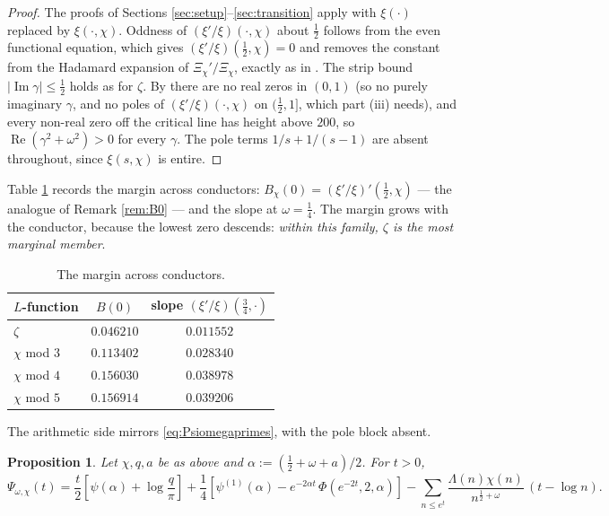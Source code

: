 \documentclass[11pt,reqno]{amsart}
\theoremstyle{plain}
\newtheorem{proposition}[theorem]{Proposition}
\theoremstyle{definition}
\newcommand{\Rp}{\operatorname{Re}}
\newcommand{\Ip}{\operatorname{Im}}
\begin{document}
\begin{proof}
The proofs of Sections \ref{sec:setup}--\ref{sec:transition} apply with $\xi(\cdot)$ replaced by
$\xi(\cdot,\chi)$. Oddness of $(\xi'/\xi)(\cdot,\chi)$ about $\tfrac12$ follows from the even
functional equation, which gives $(\xi'/\xi)(\tfrac12,\chi)=0$ and removes the constant from the
Hadamard expansion of $\Xi_\chi'/\Xi_\chi$, exactly as in \cite[\S2.2]{Suzuki2023}. The strip
bound $|\Ip\gamma|\le\tfrac12$ holds as for $\zeta$. By \cite{Platt2016} there are no real zeros
in $(0,1)$ (so no purely imaginary $\gamma$, and no poles of $(\xi'/\xi)(\cdot,\chi)$ on
$(\tfrac12,1]$, which part (iii) needs), and every non-real zero off the critical line has height
above $200$, so $\Rp(\gamma^{2}+\omega^{2})>0$ for every $\gamma$. The pole terms $1/s+1/(s-1)$
are absent throughout, since $\xi(s,\chi)$ is entire.
\end{proof}

Table \ref{tab:conductor} records the margin across conductors: $B_\chi(0)=(\xi'/\xi)'(\tfrac12,\chi)$
--- the analogue of Remark \ref{rem:B0} --- and the slope at $\omega=\tfrac14$. The margin grows
with the conductor, because the lowest zero descends: \emph{within this family, $\zeta$ is the most
marginal member}.

\begin{table}[htbp]
\centering
\begin{tabular}{@{}lcc@{}}
\toprule
$L$-function & $B(0)$ & slope $(\xi'/\xi)(\tfrac34,\cdot)$ \\
\midrule
$\zeta$        & $0.046210$ & $0.011552$\\
$\chi$ mod $3$ & $0.113402$ & $0.028340$\\
$\chi$ mod $4$ & $0.156030$ & $0.038978$\\
$\chi$ mod $5$ & $0.156914$ & $0.039206$\\
\bottomrule
\end{tabular}
\vspace{2mm}
\caption{The margin across conductors.}
\label{tab:conductor}
\end{table}

The arithmetic side mirrors \eqref{eq:Psiomegaprimes}, with the pole block absent.

\begin{proposition}\label{prop:chiprime}
Let $\chi,q,a$ be as above and $\alpha:=(\tfrac12+\omega+a)/2$. For $t>0$,
\[
  \Psi_{\omega,\chi}(t)=\frac t2\left[\psi(\alpha)+\log\frac q\pi\right]
  +\frac14\left[\psi^{(1)}(\alpha)-e^{-2\alpha t}\,\Phi\!\left(e^{-2t},2,\alpha\right)\right]
  -\sum_{n\le e^{t}}\frac{\Lambda(n)\chi(n)}{n^{\frac12+\omega}}\,(t-\log n).
\]
\end{proposition}
\end{document}
